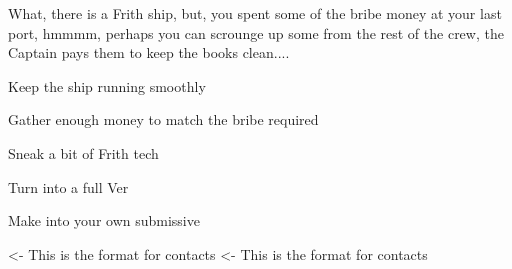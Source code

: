 \documentclass[char]{guildcamp4}
\begin{document}
What, there is a Frith ship, but, you spent some of the bribe money at your last port, hmmmm, perhaps you can scrounge up some from the rest of the crew, the Captain pays them to keep the books clean....

\begin{itemz}[Goals]
	\item Keep the ship running smoothly
	\item Gather enough money to match the bribe required
	\item Sneak a bit of Frith tech
	\item Turn \cJulie{} into a full Ver
	\item Make \cJulie{} into your own submissive
\end{itemz}

\begin{itemz}[Notes]
	\item 
\end{itemz}

\begin{contacts}
	\contact{\cVone{}} <- This is the format for contacts 
	\contact{\cVthree{}} <- This is the format for contacts 
	\contact{\cJoan{}}
	\contact{\cJulie{}}
	\contact{\cJames{}}
	\contact{\cRasputin{}}
	\contact{\cSpite{}}
	\contact{\cPlead{}}
\end{contacts}
\end{document}
